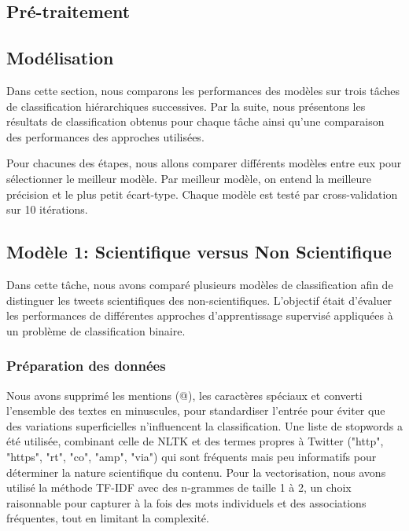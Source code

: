 \subsection{Pré-traitement}\label{subsec:pre-traitement}


\subsection{Modélisation}\label{subsec:modelisation}
Dans cette section, nous comparons les performances des modèles sur trois tâches de classification hiérarchiques successives.
Par la suite, nous présentons les résultats de classification obtenus pour chaque tâche ainsi qu’une comparaison des performances des approches utilisées.

\noindent Pour chacunes des étapes, nous allons comparer différents modèles entre eux pour sélectionner le meilleur modèle.
Par meilleur modèle, on entend la meilleure précision et le plus petit écart-type.
Chaque modèle est testé par cross-validation sur 10 itérations.

\subsection{Modèle 1: Scientifique versus Non Scientifique}\label{subsec:modele-1:-sci-vs-non-sci}
Dans cette tâche, nous avons comparé plusieurs modèles de classification afin de distinguer les tweets scientifiques des non-scientifiques.
L’objectif était d’évaluer les performances de différentes approches d’apprentissage supervisé appliquées à un problème de classification binaire.

\subsubsection{Préparation des données}
Nous avons supprimé les mentions (@), les caractères spéciaux et converti l’ensemble des textes en minuscules, pour standardiser l’entrée pour éviter que des variations superficielles n’influencent la classification.
Une liste de stopwords a été utilisée, combinant celle de NLTK et des termes propres à Twitter ("http", "https", "rt", "co", "amp", "via") qui sont fréquents mais peu informatifs pour déterminer la nature scientifique du contenu.
Pour la vectorisation, nous avons utilisé la méthode TF-IDF avec des n-grammes de taille 1 à 2, un choix raisonnable pour capturer à la fois des mots individuels et des associations fréquentes, tout en limitant la complexité.

